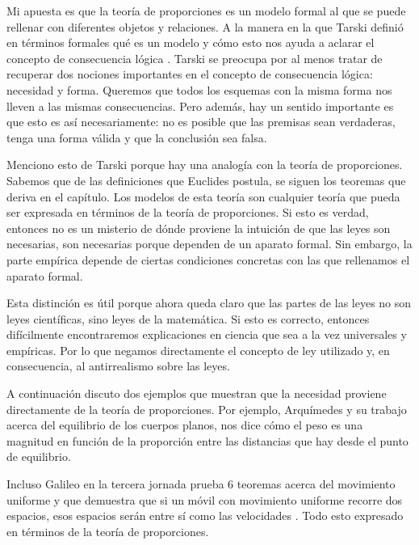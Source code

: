 Mi apuesta es que la teoría de proporciones es un modelo formal al que se puede rellenar con diferentes objetos y relaciones. A la manera en la que Tarski definió en términos formales qué es un modelo y cómo esto nos ayuda a aclarar el concepto de consecuencia lógica \cite{Tarski1956}. Tarski se preocupa por al menos tratar de recuperar dos nociones importantes en el concepto de consecuencia lógica: necesidad y forma. \cite{Torrente2000} Queremos que todos los esquemas con la misma forma nos lleven a las mismas consecuencias. Pero además, hay un sentido importante es que esto es así necesariamente: no es posible que las premisas sean verdaderas, tenga una forma válida y que la conclusión sea falsa.

Menciono esto de Tarski porque hay una analogía con la teoría de proporciones. Sabemos que de las definiciones que Euclides postula, se siguen los teoremas que deriva en el capítulo. Los modelos de esta teoría son cualquier teoría que pueda ser expresada en términos de la teoría de proporciones. Si esto es verdad, entonces no es un misterio de dónde proviene la intuición de que las leyes son necesarias, son necesarias porque dependen de un aparato formal. Sin embargo, la parte empírica depende de ciertas condiciones concretas con las que rellenamos el aparato formal.

Esta distinción es útil porque ahora queda claro que las partes de las leyes no son leyes científicas, sino leyes de la matemática. Si esto es correcto, entonces difícilmente encontraremos explicaciones en ciencia que sea a la vez universales y empíricas. Por lo que negamos directamente el concepto de ley utilizado y, en consecuencia, al antirrealismo sobre las leyes.

A continuación discuto dos ejemplos que muestran que la necesidad proviene directamente de la teoría de proporciones. Por ejemplo, Arquímedes y su trabajo acerca del equilibrio de los cuerpos planos, nos dice cómo el peso es una magnitud en función de la proporción entre las distancias que hay desde el punto de equilibrio.

Incluso Galileo en la tercera jornada prueba 6 teoremas acerca del movimiento uniforme y que demuestra que si un móvil con movimiento uniforme recorre dos espacios, esos espacios serán entre sí como las velocidades \cite[p. 215]{galtre}. Todo esto expresado en términos de la teoría de proporciones.

